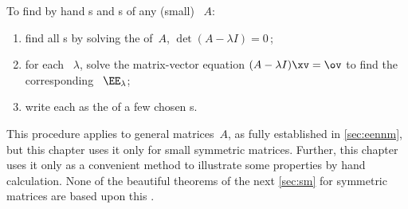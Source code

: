 \begin{procedure} \label{pro:eeh}
To find by hand s and s of any (small) ~\(A\):
\begin{enumerate}
\item find all s by solving the  of~\(A\), \(\det(A-\lambda I)=0\)\,;
\item for each ~\(\lambda\), solve the  matrix-vector equation \((A-\lambda I)\xv=\ov\) to find the corresponding ~\(\EE_\lambda\);
\item write each  as the  of a few chosen s.
\end{enumerate}
\end{procedure}

This procedure applies to general matrices~\(A\), as fully established in \cref{sec:eennm}, but this chapter uses it only for small symmetric matrices.
Further, this chapter uses it only as a convenient method to illustrate some properties by hand calculation.
None of the beautiful theorems of the next \cref{sec:sm} for symmetric matrices are based upon this .


